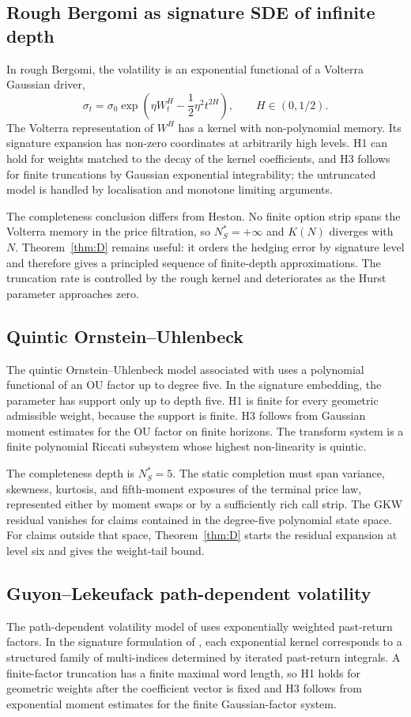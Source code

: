 \documentclass[11pt,oneside]{article}
\theoremstyle{plain}
\theoremstyle{definition}
\theoremstyle{remark}
\begin{document}
\subsection{Rough Bergomi as signature SDE of infinite depth}\label{subsec:rough-bergomi}
In rough Bergomi, the volatility is an exponential functional of a Volterra Gaussian driver,
\[
\sigma_t=\sigma_0\exp\left(\eta W_t^H-\frac12\eta^2t^{2H}\right),\qquad H\in(0,1/2).
\]
The Volterra representation of $W^H$ has a kernel with non-polynomial memory. Its signature expansion has non-zero coordinates at arbitrarily high levels. H1 can hold for weights matched to the decay of the kernel coefficients, and H3 follows for finite truncations by Gaussian exponential integrability; the untruncated model is handled by localisation and monotone limiting arguments.

The completeness conclusion differs from Heston. No finite option strip spans the Volterra memory in the price filtration, so $N_S^\ast=+\infty$ and $K(N)$ diverges with $N$. Theorem~\ref{thm:D} remains useful: it orders the hedging error by signature level and therefore gives a principled sequence of finite-depth approximations. The truncation rate is controlled by the rough kernel and deteriorates as the Hurst parameter approaches zero.

\subsection{Quintic Ornstein--Uhlenbeck}\label{subsec:quintic-ou}
The quintic Ornstein--Uhlenbeck model associated with \citet{AbiJaberIllandLi2023} uses a polynomial functional of an OU factor up to degree five. In the signature embedding, the parameter has support only up to depth five. H1 is finite for every geometric admissible weight, because the support is finite. H3 follows from Gaussian moment estimates for the OU factor on finite horizons. The transform system is a finite polynomial Riccati subsystem whose highest non-linearity is quintic.

The completeness depth is $N_S^\ast=5$. The static completion must span variance, skewness, kurtosis, and fifth-moment exposures of the terminal price law, represented either by moment swaps or by a sufficiently rich call strip. The GKW residual vanishes for claims contained in the degree-five polynomial state space. For claims outside that space, Theorem~\ref{thm:D} starts the residual expansion at level six and gives the weight-tail bound.

\subsection{Guyon--Lekeufack path-dependent volatility}\label{subsec:guyon-lekeufack}
The path-dependent volatility model of \citet{GuyonLekeufack2023} uses exponentially weighted past-return factors. In the signature formulation of \citet{AbiJaberGerardHuang2024}, each exponential kernel corresponds to a structured family of multi-indices determined by iterated past-return integrals. A finite-factor truncation has a finite maximal word length, so H1 holds for geometric weights after the coefficient vector is fixed and H3 follows from exponential moment estimates for the finite Gaussian-factor system.
\end{document}
